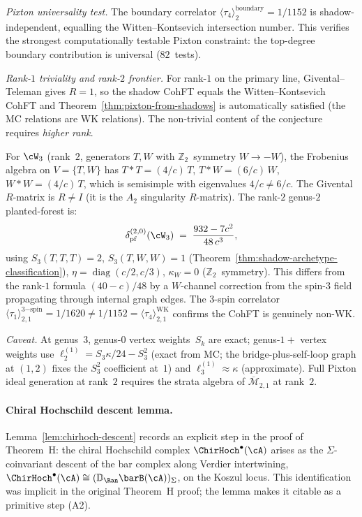 \begin{remark}
\emph{Pixton universality test.}
The boundary correlator
$\langle\tau_4\rangle_2^{\mathrm{boundary}} = 1/1152$
is shadow-independent, equalling the Witten--Kontsevich
intersection number.
This verifies the strongest computationally testable
Pixton constraint: the top-degree boundary contribution
is universal ($82$~tests).

\emph{Rank-$1$ triviality and rank-$2$ frontier.}
For rank-$1$ on the primary line, Givental--Teleman gives
$R = 1$, so the shadow CohFT equals the Witten--Kontsevich CohFT and
Theorem~\ref{thm:pixton-from-shadows} is automatically satisfied
(the MC relations are WK relations).
The non-trivial content of the conjecture requires \emph{higher rank}.

For $\cW_3$ (rank~$2$, generators $T,W$ with $\mathbb{Z}_2$~symmetry
$W \to -W$), the Frobenius algebra on $V = \{T,W\}$ has
$T{*}T = (4/c)\,T$, $T{*}W = (6/c)\,W$, $W{*}W = (4/c)\,T$,
which is semisimple with eigenvalues $4/c \neq 6/c$.
The Givental $R$-matrix is $R \neq I$ (it is the $A_2$ singularity
$R$-matrix). The rank-$2$ genus-$2$ planted-forest is:
\begin{equation}\label{eq:w3-planted-forest-genus2-conc}
\delta_{\mathrm{pf}}^{(2,0)}(\cW_3)
\;=\;
\frac{932 - 7c^2}{48\,c^3},
\end{equation}
using $S_3(T,T,T) = 2$, $S_3(T,W,W) = 1$
(Theorem~\ref{thm:shadow-archetype-classification}),
$\eta = \operatorname{diag}(c/2, c/3)$,
$\kappa_W = 0$ ($\mathbb{Z}_2$~symmetry).
This differs from the rank-$1$ formula $(40{-}c)/48$ by a
$W$-channel correction from the spin-$3$ field
propagating through internal graph edges.
The $3$-spin correlator
$\langle\tau_1\rangle_{2,1}^{3\mathrm{-spin}} = 1/1620
\neq 1/1152 = \langle\tau_4\rangle_{2,1}^{\mathrm{WK}}$
confirms the CohFT is genuinely non-WK.

\emph{Caveat.}
At genus~$3$, genus-$0$ vertex weights~$S_k$ are exact;
genus-$1{+}$ vertex weights use
$\ell_2^{(1)} = S_3\kappa/24 - S_3^2$ (exact from MC; the
bridge-plus-self-loop graph at $(1,2)$ fixes the $S_3^2$
coefficient at~$1$)
and $\ell_3^{(1)} \approx \kappa$ (approximate).
Full Pixton ideal generation at rank~$2$ requires
the strata algebra of $\overline{\mathcal{M}}_{2,1}$
at rank~$2$.
\end{remark}


\paragraph{Chiral Hochschild descent lemma.}
Lemma~\ref{lem:chirhoch-descent} records an explicit step
in the proof of Theorem~H: the chiral Hochschild complex
$\ChirHoch^{\bullet}(\cA)$ arises as the $\Sigma$-coinvariant
descent of the bar complex along Verdier intertwining,
$\ChirHoch^{\bullet}(\cA) \cong
(\mathbb{D}_{\Ran}\barB(\cA))_{\Sigma}$,
on the Koszul locus. This identification was implicit in
the original Theorem~H proof; the lemma makes it citable
as a primitive step (A2).

